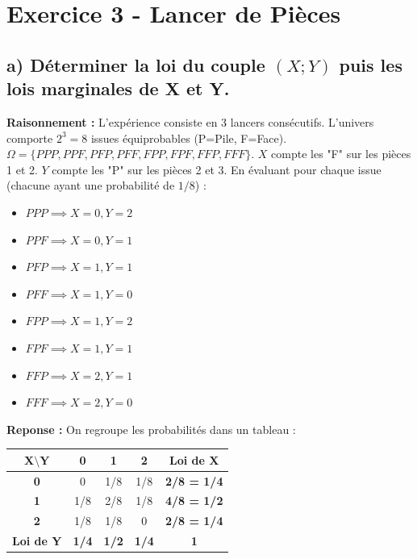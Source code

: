 \documentclass[11pt,a4paper]{article}
\begin{document}
\hrulefill

\section*{Exercice 3 - Lancer de Pièces}

\subsection*{a) Déterminer la loi du couple $(X;Y)$ puis les lois marginales de X et Y.}

\textbf{Raisonnement :} 
L'expérience consiste en 3 lancers consécutifs. L'univers comporte $2^3 = 8$ issues équiprobables (P=Pile, F=Face).
$\Omega = \{PPP, PPF, PFP, PFF, FPP, FPF, FFP, FFF\}$.
$X$ compte les "F" sur les pièces 1 et 2. $Y$ compte les "P" sur les pièces 2 et 3.
En évaluant pour chaque issue (chacune ayant une probabilité de $1/8$) :
\begin{itemize}
    \item $PPP \implies X=0, Y=2$
    \item $PPF \implies X=0, Y=1$
    \item $PFP \implies X=1, Y=1$
    \item $PFF \implies X=1, Y=0$
    \item $FPP \implies X=1, Y=2$
    \item $FPF \implies X=1, Y=1$
    \item $FFP \implies X=2, Y=1$
    \item $FFF \implies X=2, Y=0$
\end{itemize}

\textbf{Reponse :}
On regroupe les probabilités dans un tableau :
\begin{table}[h!]
    \centering
    \begin{tabular}{|c|c|c|c||c|}
    \hline
    $\mathbf{X \setminus Y}$ & \textbf{0} & \textbf{1} & \textbf{2} & \textbf{Loi de X} \\ \hline
    \textbf{0}               & 0          & 1/8        & 1/8        & \textbf{2/8 = 1/4} \\ \hline
    \textbf{1}               & 1/8        & 2/8        & 1/8        & \textbf{4/8 = 1/2} \\ \hline
    \textbf{2}               & 1/8        & 1/8        & 0          & \textbf{2/8 = 1/4} \\ \hline \hline
    \textbf{Loi de Y}        & \textbf{1/4} & \textbf{1/2} & \textbf{1/4} & \textbf{1} \\ \hline
    \end{tabular}
\end{table}
\end{document}
